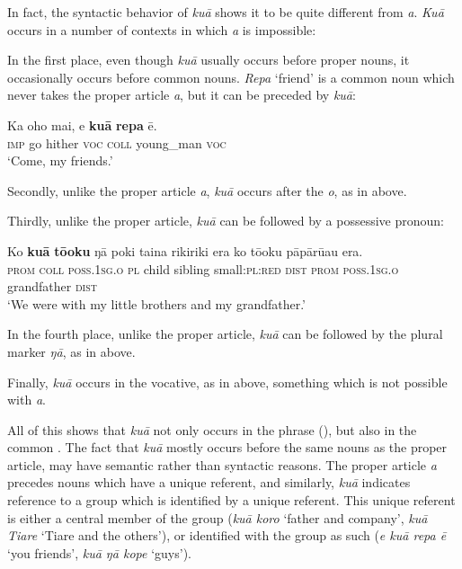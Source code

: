 In fact, the syntactic behavior of \textit{kuā} shows it to be quite different from \textit{a}. \textit{Kuā} occurs in a number of contexts in which \textit{a} is impossible:

In the first place, even though \textit{kuā} usually occurs before proper nouns, it occasionally occurs before common nouns. \textit{Repa} ‘friend’ is a common noun which never takes the proper article \textit{a}, but it can be preceded by \textit{kuā}:

\ea\label{ex:5.12}
\gll Ka oho mai, e \textbf{kuā} \textbf{repa} ē. \\
\textsc{imp} go hither \textsc{voc} \textsc{coll} young\_man \textsc{voc} \\

\glt
‘Come, my friends.’ \textstyleExampleref{[R313.004]} 
\z

Secondly, unlike the proper article \textit{a}, \textit{kuā} occurs after the  \textit{o}, as in  above.

Thirdly, unlike the proper article, \textit{kuā} can be followed by a possessive pronoun:

\ea\label{ex:5.13}
\gll Ko \textbf{kuā} \textbf{tō{\ꞌ}oku} ŋā poki taina rikiriki era ko tō{\ꞌ}oku  pāpārū{\ꞌ}au era.\\
\textsc{prom} \textsc{coll} \textsc{poss.1sg.o} \textsc{pl} child sibling small:\textsc{pl}:\textsc{red} \textsc{dist} \textsc{prom} \textsc{poss.1sg.o}  grandfather \textsc{dist}\\

\glt
‘We were with my little brothers and my grandfather.’ \textstyleExampleref{[R123.014]} 
\z

In the fourth place, unlike the proper article, \textit{kuā} can be followed by the plural marker \textit{ŋā}, as in  above.

Finally, \textit{kuā} occurs in the vocative, as in  above, something which is not possible with \textit{a}.

All of this shows that \textit{kuā} not only occurs in the  phrase (), but also in the common . The fact that \textit{kuā} mostly occurs before the same nouns as the proper article, may have semantic rather than syntactic reasons. The proper article \textit{a} precedes nouns which have a unique referent, and similarly, \textit{kuā} indicates reference to a group which is identified by a unique referent. This unique referent is either a central member of the group (\textit{kuā koro} ‘father and company’, \textit{kuā Tiare} ‘Tiare and the others’), or identified with the group as such (\textit{e kuā repa ē} ‘you friends’, \textit{kuā ŋā kope} ‘guys’).
